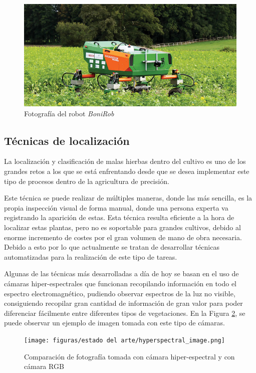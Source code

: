 \begin{figure}[h]
    \centering
    \includegraphics[width=\textwidth]{figuras/estado del arte/bonirob.jpg}
    \caption{Fotografía del robot \textit{BoniRob} \cite{Pittman2021}}
    \label{fig:bonirob}
\end{figure}

\subsection{Técnicas de localización}

La localización y clasificación de malas hierbas dentro del cultivo es uno de los grandes retos a los que se está enfrentando desde que se desea implementar este tipo de procesos \cite{Weis2008} dentro de la agricultura de precisión.

Este técnica se puede realizar de múltiples maneras, donde las más sencilla, es la propia inspección visual de forma manual, donde una persona experta va registrando la aparición de estas. Esta técnica resulta eficiente a la hora de localizar estas plantas, pero no es soportable para grandes cultivos, debido al enorme incremento de costes por el gran volumen de mano de obra necesaria. Debido a esto por lo que actualmente se tratan de desarrollar técnicas automatizadas para la realización de este tipo de tareas.

Algunas de las técnicas más desarrolladas a día de hoy se basan en el uso de cámaras hiper-espectrales \cite{Li2021} que funcionan recopilando información en todo el espectro electromagnético, pudiendo observar espectros de la luz no visible, consiguiendo recopilar gran cantidad de información de gran valor para poder diferenciar fácilmente entre diferentes tipos de vegetaciones. En la Figura \ref{fig:hyperespectral}, se puede observar un ejemplo de imagen tomada con este tipo de cámaras.

\begin{figure}[h]
    \centering
    \texttt{[image: figuras/estado del arte/hyperspectral\_image.png]}
    \caption{Comparación de fotografía tomada con cámara hiper-espectral y con cámara RGB \cite{igor_hyperspectral_2018}}
    \label{fig:hyperespectral}
\end{figure}

